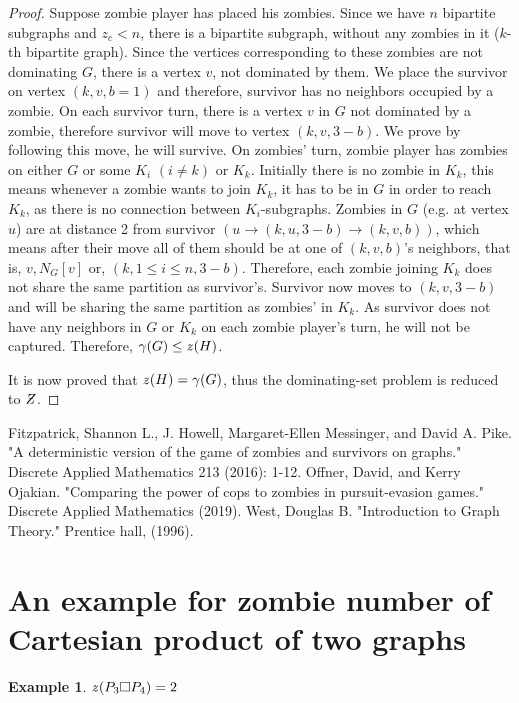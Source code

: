 \documentclass[1p]{elsarticle}
\newtheorem{example}[theorem]{Example}
\newcommand{\NPZ}{\ooalign{$Z$\cr\hfil\rule[.8ex]{.3em}{.09ex}\hfil\cr}}
\newcommand{\zn}{\ooalign{$z$\cr\hfil\rule[.5ex]{.2em}{.08ex}\hfil\cr}}
\begin{document}
\begin{proof}
		Suppose zombie player has placed his zombies. Since we have $n$ bipartite subgraphs and $z_c < n$, there is a
		bipartite subgraph, without any zombies in it ($k$-th bipartite graph). Since the vertices corresponding to
		these zombies are not dominating $G$, there is a vertex $v$, not dominated by them. We place the survivor on
		vertex $(k,v,b = 1)$ and therefore, survivor has no neighbors occupied by a zombie. On each survivor turn, there
		is a vertex $v$ in $G$ not dominated by a zombie, therefore survivor will move to vertex $(k,v,3 - b)$. We prove
		by following this move, he will survive. On zombies' turn, zombie player has zombies on either $G$ or some $K_i$
		$(i \neq k)$ or $K_k$. Initially there is no zombie in $K_k$, this means whenever a zombie wants to join $K_k$,
		it has to be in $G$ in order to reach $K_k$, as there is no connection between $K_i$-subgraphs. Zombies in $G$
		(e.g. at vertex $u$) are at distance 2 from survivor $(u \rightarrow (k,u,3 - b) \rightarrow (k,v,b))$, which
		means after their move all of them should be at one of $(k,v,b)$'s neighbors, that is, $v , N_G[v] $ or, $ (k,1
		\leq i \leq n,3 - b)$. Therefore, each zombie joining $K_k$ does not share the same partition as survivor's.
		Survivor now moves to $(k,v,3-b)$ and will be sharing the same partition as zombies' in $K_k$. As survivor does
		not have any neighbors in $G$ or $K_k$ on each zombie player's turn, he will not be captured. Therefore,
		$\gamma(G) \leq \zn(H)$.

		It is now proved that $\zn(H) = \gamma(G)$, thus the dominating-set problem is reduced to $\NPZ$.

	\end{proof}
\begin{thebibliography}{999}
	
	Fitzpatrick, Shannon L., J. Howell, Margaret-Ellen Messinger, and David A. Pike. "A deterministic version of the
	game of zombies and survivors on graphs." Discrete Applied Mathematics 213 (2016): 1-12.
	Offner, David, and Kerry Ojakian. "Comparing the power of cops to zombies in pursuit-evasion games." Discrete
	Applied Mathematics (2019).
	West, Douglas B. "Introduction to Graph Theory." Prentice hall, (1996).
\end{thebibliography}

\newpage
\appendix
\section{An example for zombie number of Cartesian product of two graphs} \label{CartesianProductExample}
\begin{example} $\zn(P_3 \square P_4 ) = 2$
\end{example}
\end{document}
